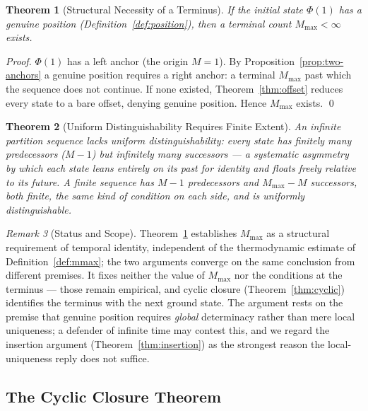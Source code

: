 \documentclass[twocolumn,10pt,a4paper]{article}
\theoremstyle{thmstyle}
\newtheorem{theorem}{Theorem}[section]
\theoremstyle{definition}
\theoremstyle{remark}
\newtheorem{remark}[theorem]{Remark}
\newcommand{\Mmax}{M_{\max}}
\newcommand{\PhiMap}{\varPhi}
\begin{document}
\begin{theorem}[Structural Necessity of a Terminus]
\label{thm:t-end}
If the initial state $\PhiMap(1)$ has a genuine position
(Definition~\ref{def:position}), then a terminal count $\Mmax < \infty$ exists.
\end{theorem}

\begin{proof}
$\PhiMap(1)$ has a left anchor (the origin $M=1$). By
Proposition~\ref{prop:two-anchors} a genuine position requires a right anchor: a
terminal $\Mmax$ past which the sequence does not continue. If none existed,
Theorem~\ref{thm:offset} reduces every state to a bare offset, denying genuine
position. Hence $\Mmax$ exists. \qed
\end{proof}

\begin{theorem}[Uniform Distinguishability Requires Finite Extent]
\label{thm:uniform}
An infinite partition sequence lacks uniform distinguishability: every state has
finitely many predecessors ($M-1$) but infinitely many successors --- a
systematic asymmetry by which each state leans entirely on its past for identity
and floats freely relative to its future. A finite sequence has $M-1$
predecessors and $\Mmax - M$ successors, both finite, the same kind of condition
on each side, and is uniformly distinguishable.
\end{theorem}

\begin{remark}[Status and Scope]
\label{rem:position-scope}
Theorem~\ref{thm:t-end} establishes $\Mmax$ as a structural requirement of
temporal identity, independent of the thermodynamic estimate of
Definition~\ref{def:mmax}; the two arguments converge on the same conclusion from
different premises. It fixes neither the value of $\Mmax$ nor the conditions at
the terminus --- those remain empirical, and cyclic closure
(Theorem~\ref{thm:cyclic}) identifies the terminus with the next ground state.
The argument rests on the premise that genuine position requires \emph{global}
determinacy rather than mere local uniqueness; a defender of infinite time may
contest this, and we regard the insertion argument
(Theorem~\ref{thm:insertion}) as the strongest reason the local-uniqueness reply
does not suffice.
\end{remark}

\subsection{The Cyclic Closure Theorem}
\end{document}
